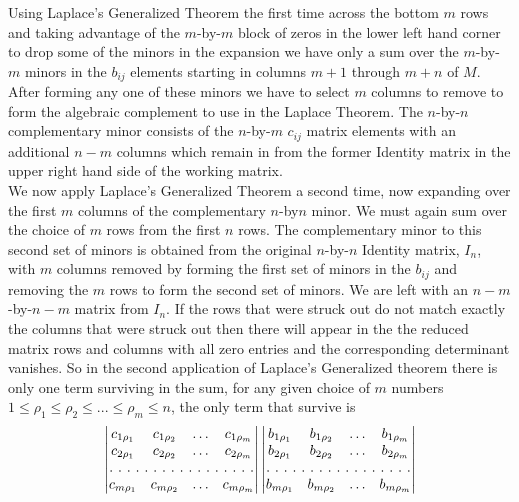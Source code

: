 Using Laplace's Generalized Theorem the first time across the bottom $m$ rows and taking advantage of the $m$-by-$m$ block of zeros in the lower left hand corner to drop some of the minors in the expansion we have only a sum over the $m$-by-$m$ minors in the $b_{ij}$ elements starting in columns $m+1$ through $m+n$ of $M$. After forming any one of these minors we have to select $m$ columns to remove to form the algebraic complement to use in the Laplace Theorem. The $n$-by-$n$ complementary minor consists of the $n$-by-$m$ $c_{ij}$ matrix elements with an additional $n-m$ columns which remain in from the former Identity matrix in the upper right hand side of the working matrix.\\

We now apply Laplace's Generalized Theorem a second time, now expanding over the first $m$ columns of the complementary $n$-by$n$ minor. We must again sum over the choice of $m$ rows from the first $n$ rows. The complementary minor to this second set of minors is obtained from the original $n$-by-$n$ Identity matrix, $I_n$, with $m$ columns removed by forming the first set of minors in the $b_{ij} $ and removing the $m$ rows to form the second set of minors. We are left with an $n-m$-by-$n-m$ matrix from $I_{n}$. If the rows that were struck out do not match exactly the columns that were struck out then there will appear in the the reduced matrix rows and columns with all zero entries and the corresponding determinant vanishes. So in the second application of Laplace's Generalized theorem there is only one term surviving in the sum, for any given choice of $m$ numbers
$1 \le \rho_1 \le \rho_2 \le ...\le \rho_m \le n$, the only term that survive is
\begin{equation}
\begin{vmatrix}
c_{1\rho_1} & c_{1\rho_2} & \hdots & c_{1\rho_m} \\
c_{2\rho_1} & c_{2\rho_2} & \hdots & c_{2\rho_m} \\
\hdotsfor[2]{4}\\
c_{m\rho_1} & c_{m\rho_2} & \hdots & c_{m\rho_m} \\
\end{vmatrix}
\begin{vmatrix}
b_{1\rho_1} & b_{1\rho_2} & \hdots & b_{1\rho_m} \\
b_{2\rho_1} & b_{2\rho_2} & \hdots & b_{2\rho_m} \\
\hdotsfor[2]{4}\\
b_{m\rho_1} & b_{m\rho_2} & \hdots & b_{m\rho_m} \\
\end{vmatrix}
\end{equation}

